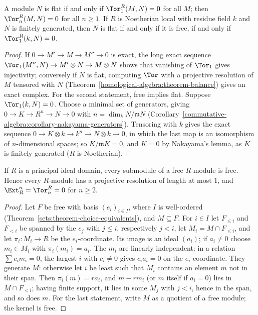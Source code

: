 \begin{proposition}\label{homological-algebra:proposition-flat-tor}
A module $N$ is flat if and only if $\Tor_1^R(M, N) = 0$ for all $M$; then $\Tor_n^R(M, N) = 0$ for all $n \geq 1$. If $R$ is
Noetherian local with residue field $k$ and $N$ is finitely generated, then $N$ is flat if and only if it is free, if and only if
$\Tor_1^R(k, N) = 0$.
\end{proposition}

\begin{proof}
If $0 \to M' \to M \to M'' \to 0$ is exact, the long exact sequence
$\Tor_1(M'', N) \to M' \otimes N \to M \otimes N$ shows that vanishing of $\Tor_1$ gives injectivity; conversely if $N$ is flat,
computing $\Tor$ with a projective resolution of $M$ tensored with $N$ (Theorem~\ref{homological-algebra:theorem-balance})
gives an exact complex. For the second statement, free implies flat. Suppose $\Tor_1(k, N) = 0$. Choose a minimal set of
generators, giving $0 \to K \to R^n \to N \to 0$ with $n = \dim_k N/\mathfrak{m}N$
(Corollary~\ref{commutative-algebra:corollary-nakayama-generators}). Tensoring with $k$ gives the exact sequence
$0 \to K \otimes k \to k^n \to N \otimes k \to 0$, in which the last map is an isomorphism of $n$-dimensional spaces; so
$K/\mathfrak{m}K = 0$, and $K = 0$ by Nakayama's lemma, as $K$ is finitely generated ($R$ is Noetherian).
\end{proof}

\begin{proposition}\label{homological-algebra:proposition-pid-submodules-free}
If $R$ is a principal ideal domain, every submodule of a free $R$-module is free. Hence every $R$-module has a projective
resolution of length at most $1$, and $\Ext^n_R = \Tor_n^R = 0$ for $n \geq 2$.
\end{proposition}

\begin{proof}
Let $F$ be free with basis $(e_i)_{i \in I}$, where $I$ is well-ordered (Theorem~\ref{sets:theorem-choice-equivalents}), and
$M \subseteq F$. For $i \in I$ let $F_{\leq i}$ and $F_{<i}$ be spanned by the $e_j$ with $j \leq i$, respectively $j < i$, let
$M_i = M \cap F_{\leq i}$, and let $\pi_i \colon M_i \to R$ be the $e_i$-coordinate. Its image is an ideal $(a_i)$; if $a_i \neq 0$ choose
$m_i \in M_i$ with $\pi_i(m_i) = a_i$. The $m_i$ are linearly independent: in a relation $\sum c_im_i = 0$, the largest $i$ with
$c_i \neq 0$ gives $c_ia_i = 0$ on the $e_i$-coordinate. They generate $M$: otherwise let $i$ be least such that $M_i$ contains an
element $m$ not in their span. Then $\pi_i(m) = ra_i$, and $m - rm_i$ (or $m$ itself if $a_i = 0$) lies in $M \cap F_{<i}$; having
finite support, it lies in some $M_j$ with $j < i$, hence in the span, and so does $m$. For the last statement, write $M$ as a
quotient of a free module; the kernel is free.
\end{proof}

